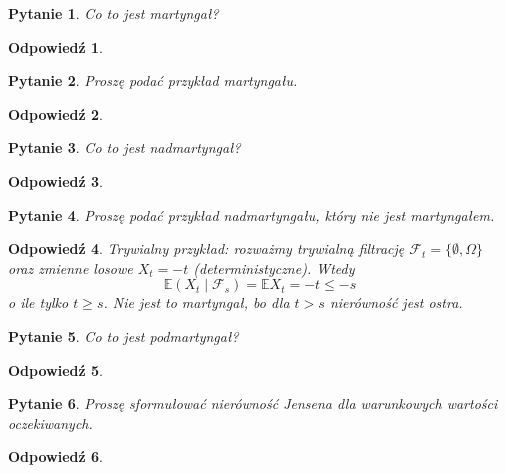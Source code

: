 \documentclass[12pt]{mwart}
\theoremstyle{plain}
\newtheorem{pytanie}{Pytanie}
\theoremstyle{break}
\newtheorem*{odpowiedź}{Odpowiedź}
\begin{document}
\begin{pytanie}
Co to jest martyngał?
\end{pytanie}
\begin{odpowiedź}
\end{odpowiedź}


\begin{pytanie}
Proszę podać przykład martyngału.
\end{pytanie}
\begin{odpowiedź}
\end{odpowiedź}


\begin{pytanie}
Co to jest nadmartyngał?
\end{pytanie}
\begin{odpowiedź}
\end{odpowiedź}


\begin{pytanie}
Proszę podać przykład nadmartyngału, który nie jest martyngałem.
\end{pytanie}
\begin{odpowiedź}
    Trywialny przykład: rozważmy trywialną filtrację
    $\mathcal{F}_t = \{\emptyset, \Omega\}$ oraz zmienne losowe
    $X_t = -t$ (deterministyczne). Wtedy  \[
    \mathbb{E}(X_t\mid \mathcal{F}_s) = \mathbb{E}X_t = -t \leq -s
    \] 
    o ile tylko $t \geq s$. Nie jest to martyngał, bo dla $t > s$
    nierówność jest ostra.
\end{odpowiedź}


\begin{pytanie}
Co to jest podmartyngał?
\end{pytanie}
\begin{odpowiedź}
\end{odpowiedź}


\begin{pytanie}
Proszę sformułować nierówność Jensena dla warunkowych wartości oczekiwanych.
\end{pytanie}
\begin{odpowiedź}
\end{odpowiedź}
\end{document}
